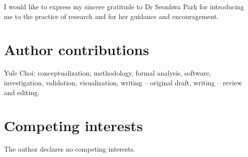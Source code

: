 \documentclass[10pt,letterpaper]{article}
\begin{document}
I would like to express my sincere gratitude to Dr Seonhwa Park for introducing me to the practice of research and for her guidance and encouragement.

\section*{Author contributions}

Yule Choi: conceptualization, methodology, formal analysis, software, investigation, validation, visualization, writing -- original draft, writing -- review and editing.




\section*{Competing interests}

The author declares no competing interests.
\end{document}
